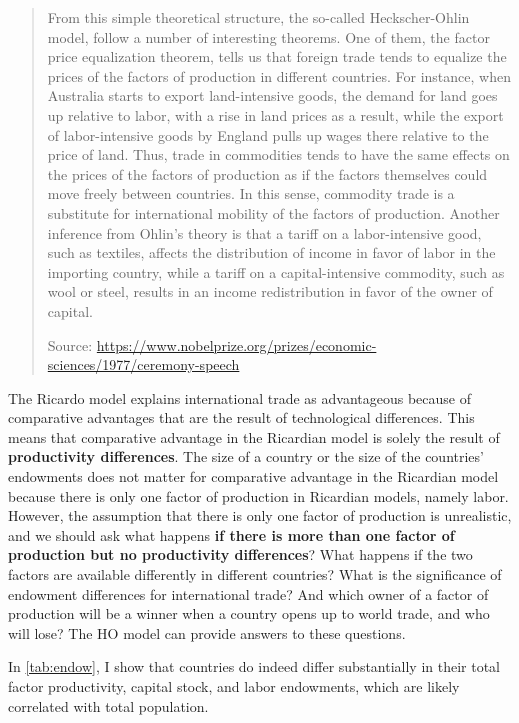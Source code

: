 {\begin{quotation}
			From this simple theoretical structure, the so-called Heckscher-Ohlin model, follow a number of interesting theorems. One of them, the factor price equalization theorem, tells us that foreign trade tends to equalize the prices of the factors of production in different countries. For instance, when Australia starts to export land-intensive goods, the demand for land goes up relative to labor, with a rise in land prices as a result, while the export of labor-intensive goods by England pulls up wages there relative to the price of land. Thus, trade in commodities tends to have the same effects on the prices of the factors of production as if the factors themselves could move freely between countries. In this sense, commodity trade is a substitute for international mobility of the factors of production. Another inference from Ohlin’s theory is that a tariff on a labor-intensive good, such as textiles, affects the distribution of income in favor of labor in the importing country, while a tariff on a capital-intensive commodity, such as wool or steel, results in an income redistribution in favor of the owner of capital.
			
			Source: \url{https://www.nobelprize.org/prizes/economic-sciences/1977/ceremony-speech}
		\end{quotation}
	}
	
	The Ricardo model explains international trade as advantageous because of comparative advantages that are the result of technological differences. This means that comparative advantage in the Ricardian model is solely the result of \textbf{productivity differences}. The size of a country or the size of the countries' endowments does not matter for comparative advantage in the Ricardian model because there is only one factor of production in Ricardian models, namely labor. However, the assumption that there is only one factor of production is unrealistic, and we should ask what happens \textbf{if there is more than one factor of production but no productivity differences}? 
	What happens if the two factors are available differently in different countries? What is the significance of endowment differences for international trade? And which owner of a factor of production will be a winner when a country opens up to world trade, and who will lose? The HO model can provide answers to these questions. 
	
	In \autoref{tab:endow}, I show that countries do indeed differ substantially in their total factor productivity, capital stock, and labor endowments, which are likely correlated with total population. 
	
